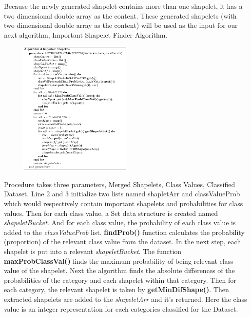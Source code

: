\documentclass[conference]{IEEEtran}  %
\begin{document}
Because the newly generated shapelet contains more than one shapelet, it has a two dimensional double array as the content. These generated shapelets (with two dimensional double array as the content) will be used as the input for our next algorithm, Important Shapelet Finder Algorithm. 


\begin{figure}[h!]
\includegraphics[width=0.5\textwidth]{algo3.png}
\end{figure}

Procedure takes three parameters, Merged Shapelets, Class Values, Classified Dataset. Line 2 and 3 initialize two lists named shapletArr and classValueProb which would respectively contain important shapelets and probabilities for class values. Then for each class value, a Set data structure is created named \textit{shapeletBucket}. And for each class value, the probability of each class value is added to the \textit{classValueProb} list. \textbf{findProb()} function calculates the probability (proportion) of the relevant class value from the dataset. In the next step, each shapelet is put into a relevant \textit{shapeletBucket}. The function \textbf{maxProbClassVal()} finds the maximum probability of being relevant class value of the shapelet. Next the algorithm finds the absolute differences of the probabilities of the category and each shapelet within that category. Then for each category, the relevant shapelet is taken by \textbf{getMinDifShape()}. Then extracted shapelets are added to the \textit{shapeletArr} and it’s returned. Here the class value is an integer representation for each categories classified for the Dataset.
\end{document}
